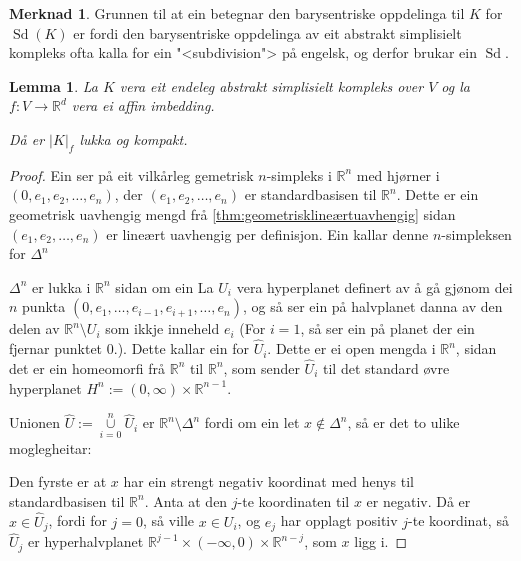 \documentclass[a4paper, 12pt, norsk]{article}
\theoremstyle{plain}
\newtheorem{lemma}[theorem]{Lemma}
\theoremstyle{definition}
\newtheorem{remark}[theorem]{Merknad}
\newcommand{\Rb}{\mathbb{R}}
\newcommand{\union}{ \mathop{\cup}\limits }
\newcommand{\gr}[1]{ \lvert #1 \rvert } %
\newcommand{\tuple}[1]{ \left( #1 \right) } %
\DeclareMathOperator{\Sd}{Sd} %
\begin{document}
\begin{remark}
	Grunnen til at ein betegnar den barysentriske oppdelinga til \( K \) for \( \Sd(K) \) er fordi den barysentriske oppdelinga av eit abstrakt simplisielt kompleks ofta kalla for ein "<subdivision"> på engelsk, og derfor brukar ein \( \Sd \).
\end{remark}

\begin{lemma} \label{thm:geometrisk-kompleks-lukka}
	La \( K \) vera eit endeleg abstrakt simplisielt kompleks over \( V \) og la \( f: V \to \Rb^d \) vera ei affin imbedding.
	
	Då er \( \gr{K}_f \) lukka og kompakt.
\end{lemma}

\begin{proof}
	Ein ser på eit vilkårleg gemetrisk \( n \)-simpleks i \( \Rb^n \) med hjørner i \( \tuple{0, e_1, e_2, \dots, e_n} \), der \( \tuple{e_1, e_2, \dots, e_n} \) er standardbasisen til \( \Rb^n \). Dette er ein geometrisk uavhengig mengd frå \autoref{thm:geometrisklineærtuavhengig} sidan \( \tuple{e_1, e_2, \dots, e_n} \) er lineært uavhengig per definisjon. Ein kallar denne \( n \)-simpleksen for \( \Delta^n \)

	\( \Delta^n \) er lukka i \( \Rb^n \) sidan om ein 
	La \( U_i \) vera hyperplanet definert av å gå gjønom dei \( n \) punkta \( \tuple{0, e_1, \dots, e_{i-1}, e_{i+1}, \dots, e_n} \), og så ser ein på halvplanet danna av den delen av \( \Rb^n \setminus U_i \) som ikkje inneheld \( e_i \) (For \( i=1 \), så ser ein på planet der ein fjernar punktet \( 0 \).). Dette kallar ein for \( \hat{U}_i \). Dette er ei open mengda i \( \Rb^n \), sidan det er ein homeomorfi frå \( \Rb^n \) til \( \Rb^n \), som sender \( \hat{U}_i \) til det standard øvre hyperplanet \( H^n := (0, \infty) \times \Rb^{n-1} \).

	Unionen \( \hat{U} := \union_{i = 0}^{n} \hat{U}_i \) er \( \Rb^n \setminus \Delta^n \) fordi om ein let \( x \not\in \Delta^n \), så er det to ulike moglegheitar:

	Den fyrste er at \( x \) har ein strengt negativ koordinat med henys til standardbasisen til \( \Rb^n \). Anta at den \( j \)-te koordinaten til \( x \) er negativ. Då er \( x \in \hat{U}_j \), fordi for \( j = 0 \), så ville \( x \in U_i \), og \( e_j \) har opplagt positiv \( j \)-te koordinat, så \( \hat{U}_j \) er hyperhalvplanet \( \Rb^{j-1}\times(-\infty, 0) \times \Rb^{n-j} \), som \( x \) ligg i.


\end{proof}
\end{document}
